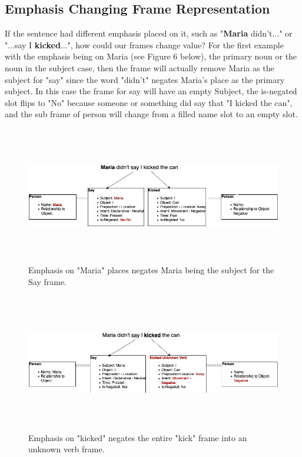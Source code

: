 \documentclass[
	letterpaper, %
]{jdf}
\begin{document}
\subsection{Emphasis Changing Frame Representation}
If the sentence had different emphasis placed on it, such as "\textbf{Maria} didn't..." or "...say I \textbf{kicked}...", how could our frames change value? For the first example with the emphasis being on Maria (see Figure 6 below), the primary noun or the noun in the subject case, then the frame will actually remove Maria as the subject for "say" since the word "didn't" negates Maria's place as the primary subject. In this case the frame for say will have an empty Subject, the is-negated slot flips to "No" because someone or something did say that "I kicked the can", and the sub frame of person will change from a filled name slot to an empty slot.
\begin{figure}[h]
	\centering
	\includegraphics[height=6cm]{Emphasis Maria.jpg}
	\caption{Emphasis on "Maria" places negates Maria being the subject for the Say frame.}
	\label{fig:flowchart}
\end{figure}

\begin{figure}[h]
	\centering
	\includegraphics[height=6cm]{Emphasis Kicked.jpg}
	\caption{Emphasis on "kicked" negates the entire "kick" frame into an unknown verb frame.}
	\label{fig:flowchart}
\end{figure}
\end{document}
